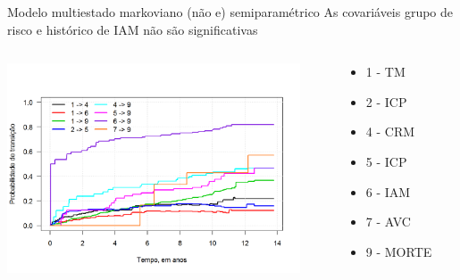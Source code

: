 \begin{frame}

\begin{block}{Modelo multiestado markoviano (não e) semiparamétrico}
 \small As covariáveis grupo de risco e histórico de IAM não são 
        significativas
\end{block}

\vspace{-.9cm}\begin{columns}
 \begin{column}{.75\textwidth}
  \begin{center}
   \includegraphics*[height = 6.2cm]{mass_probtrans_mstate.png}
  \end{center}
 \end{column}
 \scriptsize
 \begin{column}{.25\textwidth}
  \begin{center}
   \begin{itemize}
    \item 1 - TM
    \item 2 - ICP
    \item 4 - CRM
    \item 5 - ICP
    \item 6 - IAM
    \item 7 - AVC
    \item 9 - MORTE
   \end{itemize}
  \end{center}
 \end{column}
\end{columns}

\end{frame}

